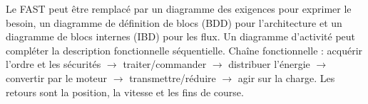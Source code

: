 \begin{corrigebox}
Le FAST peut être remplacé par un diagramme des exigences pour exprimer
            le besoin, un diagramme de définition de blocs (BDD) pour l'architecture et un
            diagramme de blocs internes (IBD) pour les flux. Un diagramme d'activité peut
            compléter la description fonctionnelle séquentielle.
Chaîne fonctionnelle : acquérir l'ordre et les sécurités $\rightarrow$
            traiter/commander $\rightarrow$ distribuer l'énergie $\rightarrow$ convertir
            par le moteur $\rightarrow$ transmettre/réduire $\rightarrow$ agir sur la
            charge. Les retours sont la position, la vitesse et les fins de course.
\end{corrigebox}
